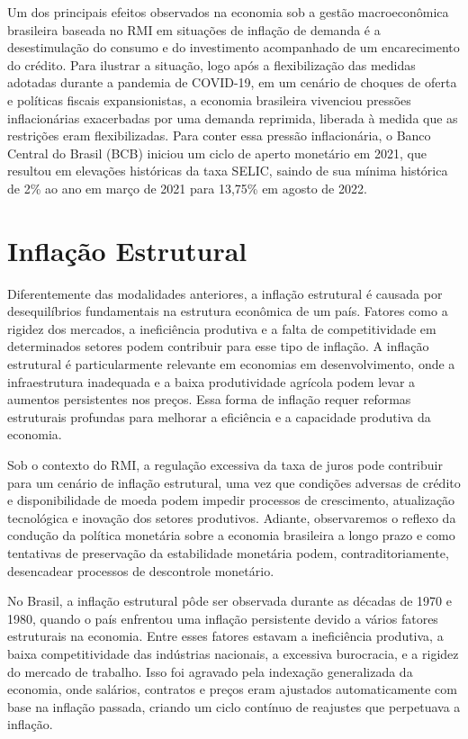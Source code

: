 \documentclass[12pt,oneside,a4paper,chapter=TITLE,english,brazil,sumario=abnt-6027-2012]{abntex2}
\begin{document}
Um dos principais efeitos observados na economia sob a gestão macroeconômica brasileira baseada no RMI em situações de inflação de demanda é a desestimulação do consumo e do investimento acompanhado de um encarecimento do crédito. Para ilustrar a situação, logo após a flexibilização das medidas adotadas durante a pandemia de COVID-19, em um cenário de choques de oferta e políticas fiscais expansionistas, a economia brasileira vivenciou pressões inflacionárias exacerbadas por uma demanda reprimida, liberada à medida que as restrições eram flexibilizadas. Para conter essa pressão inflacionária, o Banco Central do Brasil (BCB) iniciou um ciclo de aperto monetário em 2021, que resultou em elevações históricas da taxa SELIC, saindo de sua mínima histórica de 2\% ao ano em março de 2021 para 13,75\% em agosto de 2022.

\section{Inflação Estrutural} \label{seq:inflestr}

Diferentemente das modalidades anteriores, a inflação estrutural é causada por desequilíbrios fundamentais na estrutura econômica de um país. Fatores como a rigidez dos mercados, a ineficiência produtiva e a falta de competitividade em determinados setores podem contribuir para esse tipo de inflação. A inflação estrutural é particularmente relevante em economias em desenvolvimento, onde a infraestrutura inadequada e a baixa produtividade agrícola podem levar a aumentos persistentes nos preços. Essa forma de inflação requer reformas estruturais profundas para melhorar a eficiência e a capacidade produtiva da economia.

Sob o contexto do RMI, a regulação excessiva da taxa de juros pode contribuir para um cenário de inflação estrutural, uma vez que condições adversas de crédito e disponibilidade de moeda podem impedir processos de crescimento, atualização tecnológica e inovação dos setores produtivos. Adiante, observaremos o reflexo da condução da política monetária sobre a economia brasileira a longo prazo e como tentativas de preservação da estabilidade monetária podem, contraditoriamente, desencadear processos de descontrole monetário.

No Brasil, a inflação estrutural pôde ser observada durante as décadas de 1970 e 1980, quando o país enfrentou uma inflação persistente devido a vários fatores estruturais na economia. Entre esses fatores estavam a ineficiência produtiva, a baixa competitividade das indústrias nacionais, a excessiva burocracia, e a rigidez do mercado de trabalho. Isso foi agravado pela indexação generalizada da economia, onde salários, contratos e preços eram ajustados automaticamente com base na inflação passada, criando um ciclo contínuo de reajustes que perpetuava a inflação.
\end{document}
